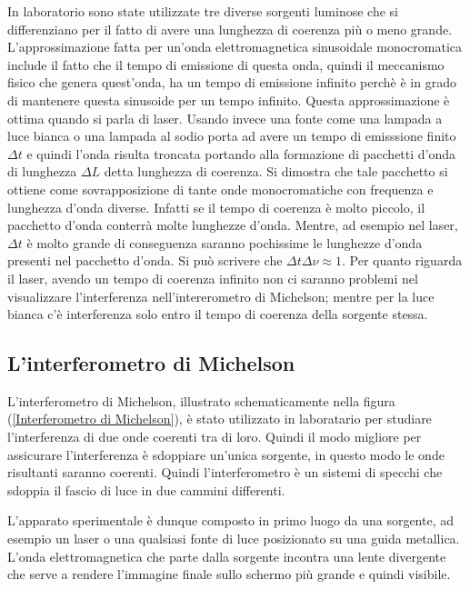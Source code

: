 \documentclass[11pt]{article}
\begin{document}
In laboratorio sono state utilizzate tre diverse sorgenti luminose che si differenziano per il fatto di avere una lunghezza di coerenza più o meno grande. L'approssimazione fatta per un'onda elettromagnetica sinusoidale monocromatica include il fatto che il tempo di emissione di questa onda, quindi il meccanismo fisico che genera quest'onda, ha un tempo di emissione infinito perchè è in grado di mantenere questa sinusoide per un tempo infinito. Questa approssimazione è ottima quando si parla di laser. Usando invece una fonte come una lampada a luce bianca o una lampada al sodio porta ad avere un tempo di emisssione finito $\Delta t$ e quindi l'onda risulta troncata portando alla formazione di pacchetti d'onda di lunghezza $\Delta L$ detta lunghezza di coerenza. Si dimostra che tale pacchetto si ottiene come sovrapposizione di tante onde monocromatiche con frequenza e lunghezza d'onda diverse. Infatti se il tempo di coerenza è molto piccolo, il pacchetto d'onda conterrà molte lunghezze d'onda. Mentre, ad esempio nel laser, $\Delta t$ è molto grande di conseguenza saranno pochissime le lunghezze d'onda presenti nel pacchetto d'onda. Si può scrivere che $\Delta t \Delta \nu \approx 1$.
Per quanto riguarda il laser, avendo un tempo di coerenza infinito non ci saranno problemi nel visualizzare l'interferenza nell'intererometro di Michelson; mentre per la luce bianca c'è interferenza solo entro il tempo di coerenza della sorgente stessa.
\subsection{L'interferometro di Michelson}
L'interferometro di Michelson, illustrato schematicamente nella figura (\ref{Interferometro di Michelson}), è stato utilizzato in laboratario per studiare l'interferenza di due onde coerenti tra di loro. Quindi il modo migliore per assicurare l'interferenza è sdoppiare un'unica sorgente, in questo modo le onde risultanti saranno coerenti. Quindi l'interferometro è un sistemi di specchi che sdoppia il fascio di luce in due cammini differenti.

L'apparato sperimentale è dunque composto in primo luogo da una sorgente, ad esempio un laser o una qualsiasi fonte di luce posizionato su una guida metallica. L'onda elettromagnetica che parte dalla sorgente incontra una lente divergente che serve a rendere l'immagine finale sullo schermo più grande e quindi visibile.
\end{document}

